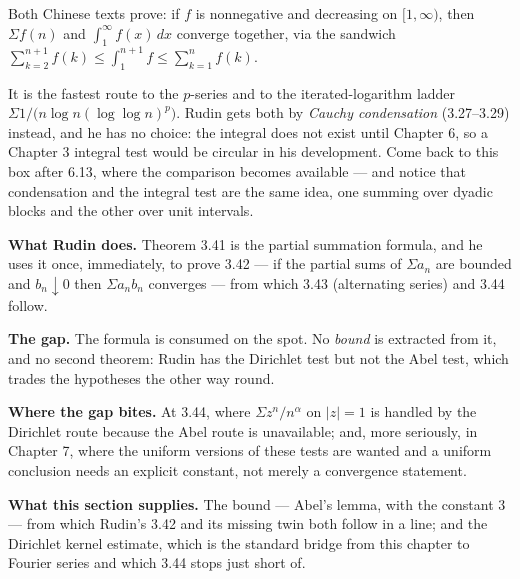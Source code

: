 \begin{deeper}
Both Chinese texts prove: if $f$ is nonnegative and decreasing on
$[1,\infty)$, then $\Sigma f(n)$ and $\int_1^{\infty} f(x)\,dx$ converge
together, via the sandwich
$\sum_{k=2}^{n+1} f(k) \le \int_1^{n+1} f \le \sum_{k=1}^{n} f(k)$.

It is the fastest route to the $p$-series and to the iterated-logarithm
ladder $\Sigma 1/\bigl(n\log n (\log\log n)^p\bigr)$. Rudin gets both by
\emph{Cauchy condensation} (3.27--3.29) instead, and he has no choice: the
integral does not exist until Chapter 6, so a Chapter 3 integral test would
be circular in his development. Come back to this box after 6.13, where the
comparison becomes available --- and notice that condensation and the
integral test are the same idea, one summing over dyadic blocks and the other
over unit intervals.
\end{deeper}


\begin{roadmap}
\raggedright
\textbf{What Rudin does.} Theorem 3.41 is the partial summation formula, and
he uses it once, immediately, to prove 3.42 --- if the partial sums of
$\Sigma a_n$ are bounded and $b_n \downarrow 0$ then $\Sigma a_nb_n$
converges --- from which 3.43 (alternating series) and 3.44 follow.

\smallskip
\textbf{The gap.} The formula is consumed on the spot. No \emph{bound} is
extracted from it, and no second theorem: Rudin has the Dirichlet test but
not the Abel test, which trades the hypotheses the other way round.

\smallskip
\textbf{Where the gap bites.} At 3.44, where $\Sigma z^n/n^{\alpha}$ on
$|z|=1$ is handled by the Dirichlet route because the Abel route is
unavailable; and, more seriously, in Chapter 7, where the uniform versions of
these tests are wanted and a uniform conclusion needs an explicit constant,
not merely a convergence statement.

\smallskip
\textbf{What this section supplies.} The bound --- Abel's lemma, with the
constant $3$ --- from which Rudin's 3.42 and its missing twin both follow in
a line; and the Dirichlet kernel estimate, which is the standard bridge from
this chapter to Fourier series and which 3.44 stops just short of.
\end{roadmap}


